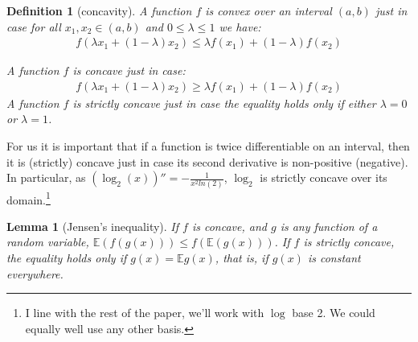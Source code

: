 \documentclass[
  letterpaper,
  DIV=11,
  numbers=noendperiod]{scrartcl}
\newtheorem{lemma}{Lemma}
\newtheorem{definition}{Definition}        %
\begin{document}
\begin{definition}[concavity]

A function $f$ is convex over an interval $(a,b)$ just in case for all  $x_1, x_2\in (a,b)$ and 
$0 \leq \lambda \leq 1$ we have:
\begin{align*}
f(\lambda x_1 + (1-\lambda)x_2) \leq \lambda f(x_1) + (1-\lambda)f(x_2)
\end{align*}

\noindent A function $f$  is concave just in case:
\begin{align*}
f(\lambda x_1 + (1-\lambda)x_2) \geq \lambda f(x_1) + (1-\lambda)f(x_2)
\end{align*}
\noindent A function $f$  is strictly concave just in case the equality holds only if either $\lambda = 0$ or $\lambda = 1$.
\end{definition}

For us it is important that if a function is twice differentiable on an
interval, then it is (strictly) concave just in case its second
derivative is non-positive (negative). In particular, as
\((\log_2(x))'' = -\frac{1}{x^2 ln(2)}\), \(\log_2\) is strictly concave
over its
domain.\footnote{I line with the rest of the paper, we'll work with $\log$ base 2. We could equally well use any other basis.}

\begin{lemma}[Jensen's inequality]
If $f$ is concave, and $g$ is any function of a random variable, $\mathbb{E}(f(g(x))) \leq f(\mathbb{E}(g(x)))$. If $f$ is 
strictly concave, the equality holds only if $g(x) = \mathbb{E} g(x)$, that is, if $g(x)$ is constant everywhere.
\end{lemma}
\end{document}
